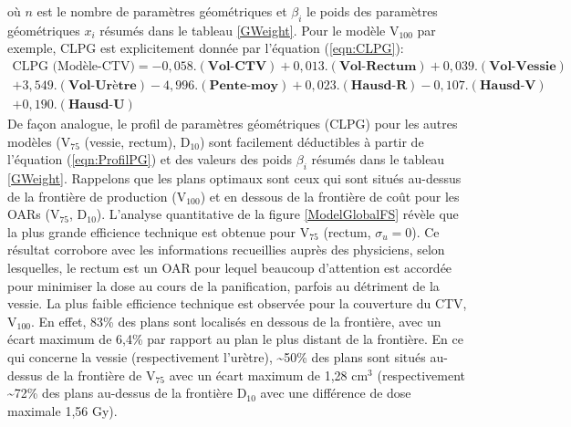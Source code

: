 %
où $n$ est le nombre de paramètres géométriques et $\beta_{i}$ le poids des paramètres géométriques $x_{i}$ résumés dans le tableau \ref{GWeight}. Pour le modèle V$_{100}$ par exemple, CLPG est explicitement donnée par l'équation (\ref{eqn:CLPG}): 
%
\begin{multline}\label{eqn:CLPG}
\textrm{CLPG (Modèle-CTV)} = -0,058.(\textbf{Vol-CTV}) + 0,013.(\textbf{Vol-Rectum}) + 0,039.(\textbf{Vol-Vessie})\\ + 3,549.(\textbf{Vol-Urètre}) - 4,996.(\textbf{Pente-moy}) + 0,023.(\textbf{Hausd-R}) - 0,107.(\textbf{Hausd-V})\\
+ 0,190.(\textbf{Hausd-U})
\end{multline}
%
De façon analogue, le profil de paramètres géométriques (CLPG) pour les autres modèles (V$_{75}$ (vessie, rectum), D$_{10}$) sont facilement déductibles à partir de l'équation (\ref{eqn:ProfilPG}) et des valeurs des poids $\beta_{i}$ résumés dans le tableau \ref{GWeight}. Rappelons que les plans optimaux sont ceux qui sont situés au-dessus de la frontière de production (V$_{100}$) et en dessous de la frontière de coût pour les OARs (V$_{75}$, D$_{10}$).  L’analyse quantitative de la figure \ref {ModelGlobalFS} révèle que la plus grande efficience technique est obtenue pour V$_{75}$ (rectum, $\sigma_{u} = 0$). Ce résultat corrobore avec les informations recueillies auprès des physiciens, selon lesquelles, le rectum est un OAR pour lequel beaucoup d’attention est accordée pour minimiser la dose au cours de la panification, parfois au détriment de la vessie. La plus faible efficience technique est observée pour la couverture du CTV, V$_{100}$. En effet, 83\% des plans sont localisés en dessous de la frontière, avec un écart maximum de 6,4\% par rapport au plan le plus distant de la frontière. En ce qui concerne la vessie (respectivement l’urètre), \textasciitilde 50\% des plans sont situés au-dessus de la frontière de V$_{75}$ avec un écart maximum de 1,28 cm$^{3}$ (respectivement \textasciitilde 72\% des plans au-dessus de la frontière D$_{10}$ avec une différence de dose maximale 1,56 Gy). 
%
